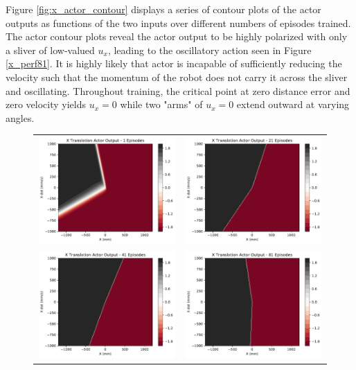 Figure \ref{fig:x_actor_contour} displays a series of contour plots of the actor outputs as functions of the two inputs over different numbers of episodes trained. The actor contour plots reveal the actor output to be highly polarized with only a sliver of low-valued $u_x$, leading to the oscillatory action seen in Figure \ref{x_perf81}. It is highly likely that actor is incapable of sufficiently reducing the velocity such that the momentum of the robot does not carry it across the sliver and oscillating. Throughout training, the critical point at zero distance error and zero velocity yields $u_x=0$ while two "arms" of $u_x=0$ extend outward at varying angles.
\begin{figure}[H]
	\begin{tabular}{cc}
		\includegraphics[width=65mm]{figures/train_figs/transx_actor/Actor1_1.pdf} &  
		\includegraphics[width=65mm]{figures/train_figs/transx_actor/Actor1_21.pdf} \\
		\includegraphics[width=65mm]{figures/train_figs/transx_actor/Actor1_41.pdf} &   \includegraphics[width=65mm]{figures/train_figs/transx_actor/Actor1_81.pdf} \\

\end{tabular}
\end{figure}
